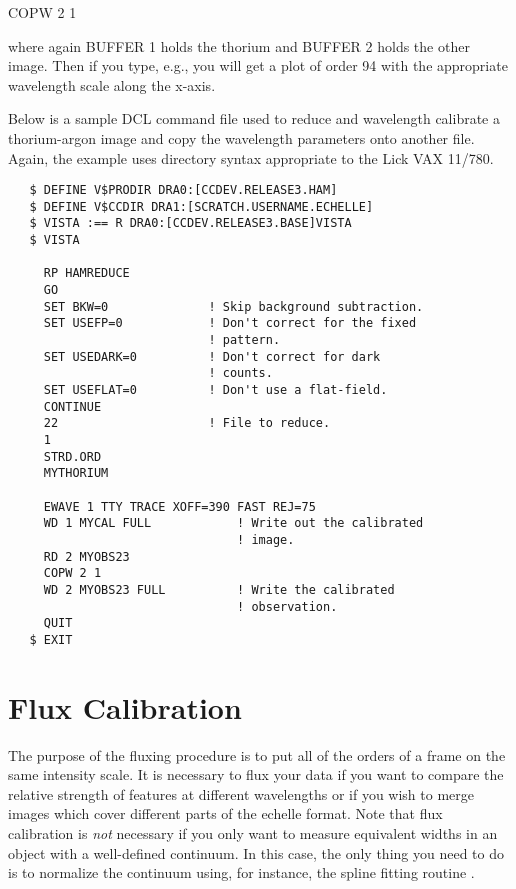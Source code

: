 \begin{command}
      \item {COPW 2 1}
\end{command}

\noindent
where again BUFFER 1 holds the thorium and BUFFER 2 holds the other image.
Then if you type, e.g.,  you will get a plot of order 94
with the appropriate wavelength scale along the x-axis.

Below is a sample DCL command file used to reduce and wavelength calibrate a
thorium-argon image and copy the wavelength parameters onto another file.
Again, the example uses directory syntax appropriate to the Lick VAX 11/780.

\vskip 0.5in

\begin{verbatim}
   $ DEFINE V$PRODIR DRA0:[CCDEV.RELEASE3.HAM]
   $ DEFINE V$CCDIR DRA1:[SCRATCH.USERNAME.ECHELLE]
   $ VISTA :== R DRA0:[CCDEV.RELEASE3.BASE]VISTA
   $ VISTA

     RP HAMREDUCE
     GO
     SET BKW=0              ! Skip background subtraction.
     SET USEFP=0            ! Don't correct for the fixed
                            ! pattern.
     SET USEDARK=0          ! Don't correct for dark
                            ! counts.
     SET USEFLAT=0          ! Don't use a flat-field.
     CONTINUE
     22                     ! File to reduce.
     1
     STRD.ORD
     MYTHORIUM

     EWAVE 1 TTY TRACE XOFF=390 FAST REJ=75
     WD 1 MYCAL FULL            ! Write out the calibrated
                                ! image.
     RD 2 MYOBS23
     COPW 2 1
     WD 2 MYOBS23 FULL          ! Write the calibrated
                                ! observation.
     QUIT
   $ EXIT
\end{verbatim}

\vskip 0.5in


\section{Flux Calibration}
\label{sec:hamflux}

The purpose of the fluxing procedure is to put all of the orders of a frame on
the same intensity scale. It is necessary to flux your data if you want to
compare the relative strength of features at different wavelengths or if you
wish to merge images which cover different parts of the echelle format. Note
that flux calibration is {\it not} necessary if you only want to measure
equivalent widths in an object with a well-defined continuum.  In this case,
the only thing you need to do is to normalize the continuum using, for
instance, the spline fitting routine .

